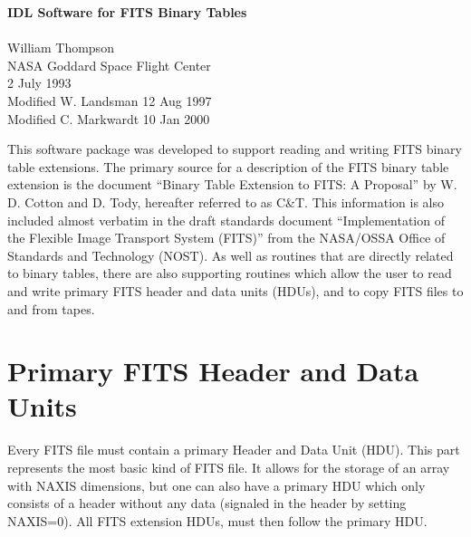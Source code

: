 
\setlength{\oddsidemargin}{0in}		%
\setlength{\topmargin}{-0.5in}		%
\setlength{\textwidth}{6.5in}		%
\setlength{\textheight}{9in}		%

\addtolength{\parskip}{0.5\baselineskip}

\thispagestyle{empty}			%

\begin{center}
{\Large\bf IDL Software for FITS Binary Tables}\\
\mbox{}\\
William Thompson\\
NASA Goddard Space Flight Center\\
2 July 1993\\
Modified W. Landsman 12 Aug 1997 \\
Modified C. Markwardt 10 Jan 2000
\end{center}

This software package was developed to support reading and writing FITS binary
table extensions.  The primary source for a description of the FITS binary
table extension is the document ``Binary Table Extension to FITS: A Proposal''
by W. D.  Cotton and D. Tody, hereafter referred to as C\&T\@.  This
information is also included almost verbatim in the draft standards document
``Implementation of the Flexible Image Transport System (FITS)'' from the
NASA/OSSA Office of Standards and Technology (NOST)\@.  As well as routines
that are directly related to binary tables, there are also supporting routines
which allow the user to read and write primary FITS header and data units
(HDUs), and to copy FITS files to and from tapes.

\section{Primary FITS Header and Data Units}

Every FITS file must contain a primary Header and Data Unit (HDU).  This part
represents the most basic kind of FITS file.  It allows for the storage of an
array with NAXIS dimensions, but one can also have a primary HDU which only
consists of a header without any data (signaled in the header by setting
NAXIS=0).  All FITS extension HDUs, must then follow the primary HDU.

